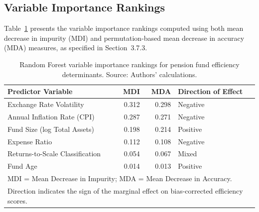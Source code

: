 \documentclass[12pt,a4paper]{article}
\begin{document}
\subsection{Variable Importance Rankings}

Table~\ref{tab:rf_importance} presents the variable importance rankings computed using both mean decrease in impurity (MDI) and permutation-based mean decrease in accuracy (MDA) measures, as specified in Section~3.7.3.

\begin{table}[H]
\centering
\caption{Random Forest variable importance rankings for pension fund efficiency determinants. Source: Authors' calculations.}
\label{tab:rf_importance}
\begin{tabular}{lrrl}
\toprule
\textbf{Predictor Variable} & \textbf{MDI} & \textbf{MDA} & \textbf{Direction of Effect} \\
\midrule
Exchange Rate Volatility              & 0.312 & 0.298 & Negative \\
Annual Inflation Rate (CPI)           & 0.287 & 0.271 & Negative \\
Fund Size (log Total Assets)          & 0.198 & 0.214 & Positive \\
Expense Ratio                         & 0.112 & 0.108 & Negative \\
Returns-to-Scale Classification       & 0.054 & 0.067 & Mixed \\
Fund Age                              & 0.014 & 0.013 & Positive \\
\bottomrule
\multicolumn{4}{l}{\footnotesize MDI = Mean Decrease in Impurity; MDA = Mean Decrease in Accuracy.} \\
\multicolumn{4}{l}{\footnotesize Direction indicates the sign of the marginal effect on bias-corrected efficiency scores.}
\end{tabular}
\end{table}
\end{document}

